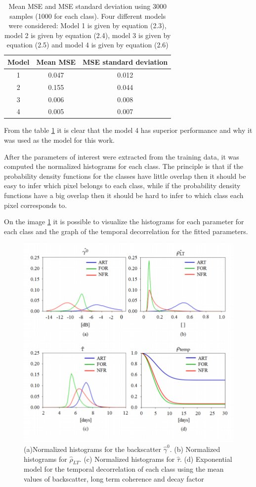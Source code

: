 \begin{table}[H]
    \centering
    \begin{tabular}{c|c|c}
    \hline
     Model&Mean MSE& MSE standard deviation  \\
     \hline
     1&0.047&0.012\\
     2&0.155&0.044\\
     3&0.006&0.008\\
     4&0.005&0.007\\
     \hline
    \end{tabular}
\caption{Mean MSE and MSE standard deviation using 3000 samples (1000 for each class). Four different models were considered: Model 1 is given by equation (2.3), model 2 is given by equation (2.4), model 3 is given by equation (2.5) and model 4 is given by equation (2.6) }
\label{tabelamse}
\end{table}

From the table \ref{tabelamse} it is clear that the model 4 has superior performance and why it was used as the model for this work.

After the parameters of interest were extracted from the training data, it was computed the normalized histograms for each class. The principle is that if the probability density functions for the classes have little overlap then it should be easy to infer which pixel belongs to each class, while if the probability density functions have a big overlap then it should be hard to infer to which class each pixel corresponds to. 

On the image \ref{fig:normalized_histograms} it is possible to visualize the histograms for each parameter for each class and the graph of the temporal decorrelation for the fitted parameters.

\begin{figure}[H]
    \centering
    \includegraphics{Cap4/histogramas.png}
    \caption{(a)Normalized histograms for the backscatter $\hat{\gamma}^0$. (b) Normalized histograms for $\hat{\rho}_{LT}$. (c) Normalized histograms for $\hat{\tau}$. (d) Exponential model for the temporal decorrelation of each class using the mean values of backscatter, long term coherence and decay factor }
    \label{fig:normalized_histograms}
\end{figure}

